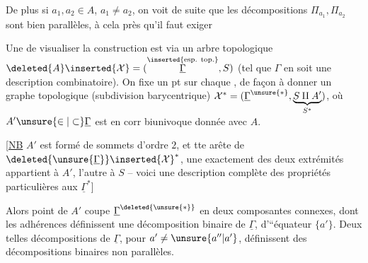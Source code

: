 
De plus si $a_1,a_2\in A$, $a_1\ne a_2$, on voit de suite que les décompositions $\Pi_{a_1},\Pi_{a_2}$ sont bien parallèles, à cela près qu'il faut exiger %

Une  de visualiser la construction est via un arbre topologique $\deleted{A}\inserted{\mathcal{X}}=(\overset{\text{\inserted{esp. top.}}}{\underline{\Gamma}},S)$ (tel que $\Gamma$ en soit une description combinatoire). On fixe un pt sur chaque , de façon à donner un graphe topologique (subdivision barycentrique) $\mathcal{X}^{\ast}=(\underline{\Gamma}^{\unsure{\ast}},\underbrace{S\amalg A'}_{S^{\ast}})$, où $A'\unsure{\in|\subset}\underline{\Gamma}$ est en corr biunivoque donnée avec  $A$.

 [\uline{NB} $A'$ est formé de  sommets d'ordre $2$, et  tte arête de $\deleted{\unsure{\underline{\Gamma}}}\inserted{\mathcal{X}}^{\ast}$, une exactement des deux extrémités appartient à $A'$, l'autre à $S$ -- voici une description complète des propriétés particulières aux $\underline{\Gamma}^{\ast}$]

Alors  point  de $A'$ coupe $\underline{\Gamma}^{\deleted{\unsure{\ast}}}$ en deux composantes connexes, dont les adhérences définissent une décomposition binaire de $\underline{\Gamma}$, d'``équateur $\{a'\}$. Deux telles décompositions  de $\underline{\Gamma}$, pour $a'\ne\unsure{a''|a'}$, définissent des décompositions binaires  non parallèles.
